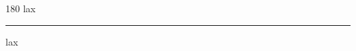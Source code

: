
\begin{frame}
\begin{center}
\begin{turn}{180}
{\fontsize{2.5cm}{1em}\selectfont lax}
\end{turn}
\vspace{1em}\par  
\hrule
\vspace{1em}\par  
{\fontsize{2.5cm}{1em}\selectfont lax}
\end{center}
\end{frame}
